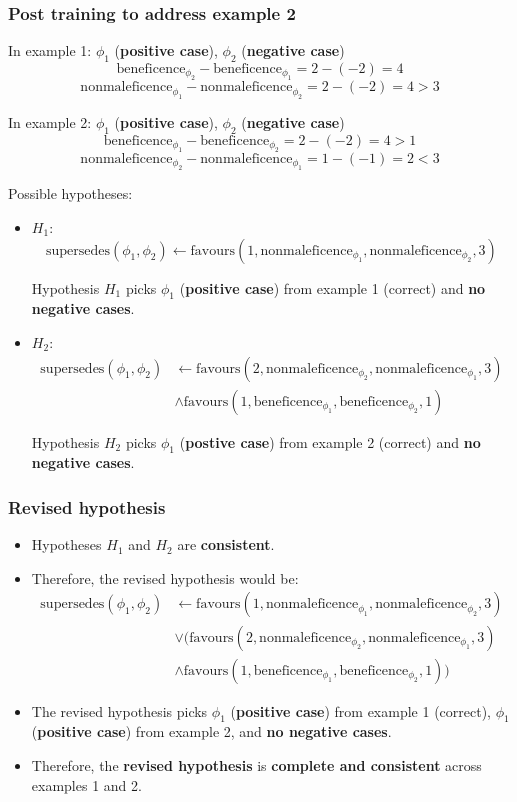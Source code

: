 \documentclass[11pt]{article}
\begin{document}
\subsubsection{Post training to address example 2}
\label{sec:org96527a7}
In example 1:
\(\phi_1\) (\textbf{positive case}), \(\phi_2\) (\textbf{negative case})
\[\text{beneficence}_{\phi_2} - \text{beneficence}_{\phi_1} = 2 - (-2) = 4\]
\[\text{nonmaleficence}_{\phi_1} - \text{nonmaleficence}_{\phi_2} = 2 - (-2) = 4 > 3\]

In example 2:
\(\phi_1\) (\textbf{positive case}), \(\phi_2\) (\textbf{negative case})
\[\text{beneficence}_{\phi_1} - \text{beneficence}_{\phi_2} = 2 - (-2) = 4 > 1\]
\[\text{nonmaleficence}_{\phi_2} - \text{nonmaleficence}_{\phi_1} = 1 - (-1) = 2 < 3\]

Possible hypotheses:
\begin{itemize}
\item \(H_1\):
\[\text{supersedes}(\phi_1, \phi_2) \leftarrow \text{favours}(1, \text{nonmaleficence}_{\phi_1}, \text{nonmaleficence}_{\phi_2}, 3)\]

Hypothesis \(H_1\) picks \(\phi_1\) (\textbf{positive case}) from example 1 (correct) and \textbf{no negative cases}.
\item \(H_2\):
\begin{align*}
\text{supersedes}(\phi_1, \phi_2) &\leftarrow \text{favours}(2, \text{nonmaleficence}_{\phi_2}, \text{nonmaleficence}_{\phi_1}, 3) \\
&\wedge \text{favours}(1, \text{beneficence}_{\phi_1}, \text{beneficence}_{\phi_2}, 1)
\end{align*}

Hypothesis \(H_2\) picks \(\phi_1\) (\textbf{postive case}) from example 2 (correct) and \textbf{no negative cases}.
\end{itemize}
\subsubsection{Revised hypothesis}
\label{sec:org679c29d}
\begin{itemize}
\item Hypotheses \(H_1\) and \(H_2\) are \textbf{consistent}.
\item Therefore, the revised hypothesis would be:
\begin{align*}
\text{supersedes}(\phi_1, \phi_2) &\leftarrow \text{favours}(1, \text{nonmaleficence}_{\phi_1}, \text{nonmaleficence}_{\phi_2}, 3) \\
&\vee (\text{favours}(2, \text{nonmaleficence}_{\phi_2}, \text{nonmaleficence}_{\phi_1}, 3) \\
&\wedge \text{favours}(1, \text{beneficence}_{\phi_1}, \text{beneficence}_{\phi_2}, 1))
\end{align*}
\item The revised hypothesis picks \(\phi_1\) (\textbf{positive case}) from example 1 (correct), \(\phi_1\) (\textbf{positive case}) from example 2, and \textbf{no negative cases}.
\item Therefore, the \textbf{revised hypothesis} is \textbf{complete and consistent} across examples 1 and 2.
\end{itemize}
\end{document}
